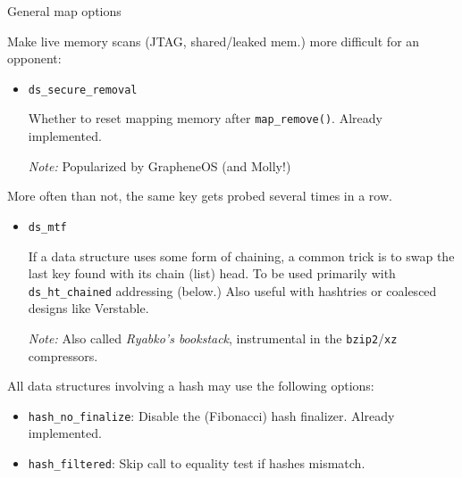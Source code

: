\begin{frame}[fragile]{General map options}

  Make live memory scans (JTAG, shared/leaked mem.) more difficult for an opponent:

  \begin{itemize}
  \item \lstinline{ds_secure_removal}

    Whether to reset mapping memory after \lstinline{map_remove()}. Already implemented.

    {\em Note:} Popularized by GrapheneOS (and Molly!)
    
  \end{itemize}
  
  More often than not, the same key gets probed several times in a row.
  
  \begin{itemize}
  \item \lstinline{ds_mtf}

    If a data structure uses some form of chaining, a common trick is to swap the last key found with its chain (list) head. To be used primarily with \lstinline{ds_ht_chained} addressing (below.) Also useful with hashtries or coalesced designs like Verstable.
    
    {\em Note:} Also called {\em Ryabko's bookstack}, instrumental in the \lstinline{bzip2}/\lstinline{xz} compressors.
  \end{itemize}  

  All data structures involving a hash may use the following options:

  \begin{itemize}
  \item \lstinline{hash_no_finalize}: Disable the (Fibonacci) hash finalizer. Already implemented.
    
  \item \lstinline{hash_filtered}: Skip call to equality test if hashes mismatch.
    
  \end{itemize}

\end{frame}


